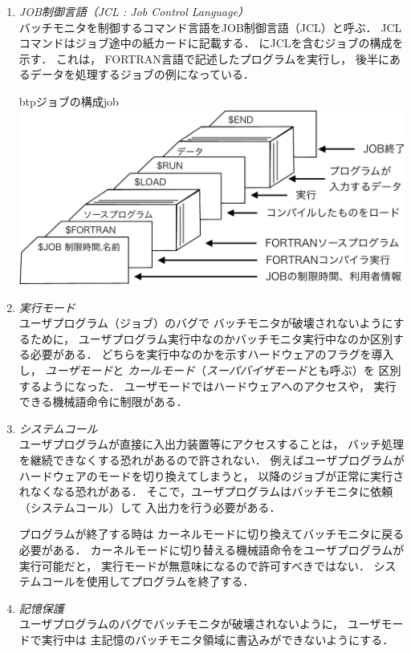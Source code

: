 \begin{enumerate}
\item \emph{JOB制御言語（JCL : Job Control Language）} \\
  バッチモニタを制御するコマンド言語をJOB制御言語（JCL）と呼ぶ．
  JCLコマンドはジョブ途中の紙カードに記載する．
  にJCLを含むジョブの構成を示す．
  これは，
  FORTRAN言語で記述したプログラムを実行し，
  後半にあるデータを処理するジョブの例になっている．

  \begin{myfig}{btp}{ジョブの構成}{job}
    \includegraphics[scale=0.5]{Fig/job-crop.pdf}
  \end{myfig}

\item \emph{実行モード} \\
  ユーザプログラム（ジョブ）のバグで
  バッチモニタが破壊されないようにするために，
  ユーザプログラム実行中なのかバッチモニタ実行中なのか区別する必要がある．
  どちらを実行中なのかを示すハードウェアのフラグを導入し，
  \emph{ユーザモード}と
  \emph{カールモード}（\emph{スーパバイザモード}とも呼ぶ）を
  区別するようになった．
  ユーザモードではハードウェアへのアクセスや，
  実行できる機械語命令に制限がある．

\item \emph{システムコール} \\
  ユーザプログラムが直接に入出力装置等にアクセスすることは，
  バッチ処理を継続できなくする恐れがあるので許されない．
  例えばユーザプログラムがハードウェアのモードを切り換えてしまうと，
  以降のジョブが正常に実行されなくなる恐れがある．
  そこで，ユーザプログラムはバッチモニタに依頼（システムコール）して
  入出力を行う必要がある．

  プログラムが終了する時は
  カーネルモードに切り換えてバッチモニタに戻る必要がある．
  カーネルモードに切り替える機械語命令をユーザプログラムが実行可能だと，
  実行モードが無意味になるので許可すべきではない．
  システムコールを使用してプログラムを終了する．

\item \emph{記憶保護} \\
  ユーザプログラムのバグでバッチモニタが破壊されないように，
  ユーザモードで実行中は
  主記憶のバッチモニタ領域に書込みができないようにする．
\end{enumerate}

